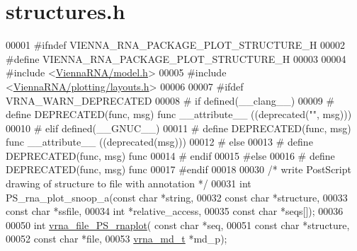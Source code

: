 \hypertarget{plotting_2structures_8h_source}{}\section{structures.\+h}
\label{plotting_2structures_8h_source}

\begin{DoxyCode}
00001 \textcolor{preprocessor}{#ifndef VIENNA\_RNA\_PACKAGE\_PLOT\_STRUCTURE\_H}
00002 \textcolor{preprocessor}{#define VIENNA\_RNA\_PACKAGE\_PLOT\_STRUCTURE\_H}
00003 
00004 \textcolor{preprocessor}{#include <\hyperlink{model_8h}{ViennaRNA/model.h}>}
00005 \textcolor{preprocessor}{#include <\hyperlink{layouts_8h}{ViennaRNA/plotting/layouts.h}>}
00006 
00007 \textcolor{preprocessor}{#ifdef VRNA\_WARN\_DEPRECATED}
00008 \textcolor{preprocessor}{# if defined(\_\_clang\_\_)}
00009 \textcolor{preprocessor}{#  define DEPRECATED(func, msg) func \_\_attribute\_\_ ((deprecated("", msg)))}
00010 \textcolor{preprocessor}{# elif defined(\_\_GNUC\_\_)}
00011 \textcolor{preprocessor}{#  define DEPRECATED(func, msg) func \_\_attribute\_\_ ((deprecated(msg)))}
00012 \textcolor{preprocessor}{# else}
00013 \textcolor{preprocessor}{#  define DEPRECATED(func, msg) func}
00014 \textcolor{preprocessor}{# endif}
00015 \textcolor{preprocessor}{#else}
00016 \textcolor{preprocessor}{# define DEPRECATED(func, msg) func}
00017 \textcolor{preprocessor}{#endif}
00018 
00030 \textcolor{comment}{/* write PostScript drawing of structure to file with annotation */}
00031 \textcolor{keywordtype}{int} PS\_rna\_plot\_snoop\_a(\textcolor{keyword}{const} \textcolor{keywordtype}{char} *\textcolor{keywordtype}{string},
00032                         \textcolor{keyword}{const} \textcolor{keywordtype}{char} *structure,
00033                         \textcolor{keyword}{const} \textcolor{keywordtype}{char} *ssfile,
00034                         \textcolor{keywordtype}{int} *relative\_access,
00035                         \textcolor{keyword}{const} \textcolor{keywordtype}{char} *seqs[]);
00036 
00050 \textcolor{keywordtype}{int} \hyperlink{group__plotting__utils_gabdc8f6548ba4a3bc3cd868ccbcfdb86a}{vrna\_file\_PS\_rnaplot}( \textcolor{keyword}{const} \textcolor{keywordtype}{char} *seq,
00051                           \textcolor{keyword}{const} \textcolor{keywordtype}{char} *structure,
00052                           \textcolor{keyword}{const} \textcolor{keywordtype}{char} *file,
00053                           \hyperlink{group__model__details_structvrna__md__s}{vrna\_md\_t}  *md\_p);

\end{DoxyCode}
